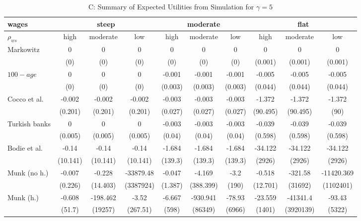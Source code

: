 \begin{table}[h!]\ContinuedFloat
	\centering
	\caption{C: Summary of Expected Utilities from Simulation for $\gamma=5$}
	\label{table:util}
	\begin{tabular}[c]{|l|ccc|ccc|ccc|}
		\hline
		 wages& \multicolumn{3}{c|}{steep} & \multicolumn{3}{c|}{moderate} & \multicolumn{3}{c|}{flat}\\
		\hline
		$\rho_{ws}$&high&moderate&low&high&moderate&low&high&moderate&low\\
		\hline
Markowitz					&0&0&0&0&0&0&0&0&0\\
							&(0)&(0)&(0)&(0)&(0)&(0)&(0.001)&(0.001)&(0.001)\\
$100-age$					&0&0&0&-0.001&-0.001&-0.001&-0.005&-0.005&-0.005\\
							&(0)&(0)&(0)&(0.003)&(0.003)&(0.003)&(0.044)&(0.044)&(0.044)\\
Cocco et al.				&-0.002&-0.002&-0.002&-0.003&-0.003&-0.003&-1.372&-1.372&-1.372\\
							&(0.201)&(0.201)&(0.201)&(0.027)&(0.027)&(0.027)&(90.495)&(90.495)&(90)\\
Turkish banks			 	&0&0&0&-0.003&-0.003&-0.003&-0.039&-0.039&-0.039\\
							&(0.005)&(0.005)&(0.005)&(0.04)&(0.04)&(0.04)&(0.598)&(0.598)&(0.598)\\
Bodie et al.			 	&-0.14&-0.14&-0.14&-1.684&-1.684&-1.684&-34.122&-34.122&-34.122\\
							&(10.141)&(10.141)&(10.141)&(139.3)&(139.3)&(139.3)&(2926)&(2926)&(2926)\\
Munk (no h.)				&-0.007&-0.228&-33879.48&-0.047&-4.169&-3.2&-0.518&-321.58&-11420.369\\
							&(0.226)&(14.403)&(3387924)&(1.387)&(388.399)&(190)&(12.701)&(31692)&(1102401)\\
Munk (h.)					&-0.608&-198.462&-3.52&-6.667&-930.941&-78.93&-23.559&-41341.4&-93.43\\
							&(51.7)&(19257)&(267.51)&(598)&(86349)&(6966)&(1401)&(3920139)&(5322)\\
	\hline
	\end{tabular}
\end{table}
